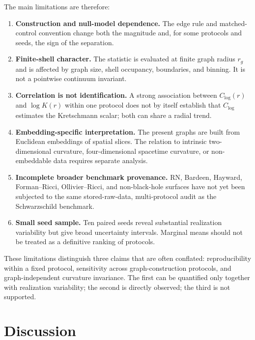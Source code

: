 \documentclass[11pt,a4paper]{article}
\begin{document}
The main limitations are therefore:
\begin{enumerate}
    \item \textbf{Construction and null-model dependence.} The edge rule and matched-control convention change both the magnitude and, for some protocols and seeds, the sign of the separation.

    \item \textbf{Finite-shell character.} The statistic is evaluated at finite graph radius $r_g$ and is affected by graph size, shell occupancy, boundaries, and binning. It is not a pointwise continuum invariant.

    \item \textbf{Correlation is not identification.} A strong association between $C_{\log}(r)$ and $\log K(r)$ within one protocol does not by itself establish that $C_{\log}$ estimates the Kretschmann scalar; both can share a radial trend.

    \item \textbf{Embedding-specific interpretation.} The present graphs are built from Euclidean embeddings of spatial slices. The relation to intrinsic two-dimensional curvature, four-dimensional spacetime curvature, or non-embeddable data requires separate analysis.

    \item \textbf{Incomplete broader benchmark provenance.} RN, Bardeen, Hayward, Forman--Ricci, Ollivier--Ricci, and non-black-hole surfaces have not yet been subjected to the same stored-raw-data, multi-protocol audit as the Schwarzschild benchmark.

    \item \textbf{Small seed sample.} Ten paired seeds reveal substantial realization variability but give broad uncertainty intervals. Marginal means should not be treated as a definitive ranking of protocols.
\end{enumerate}

These limitations distinguish three claims that are often conflated: reproducibility within a fixed protocol, sensitivity across graph-construction protocols, and graph-independent curvature invariance. The first can be quantified only together with realization variability; the second is directly observed; the third is not supported.

\section{Discussion}
\label{sec:discussion}
\end{document}
